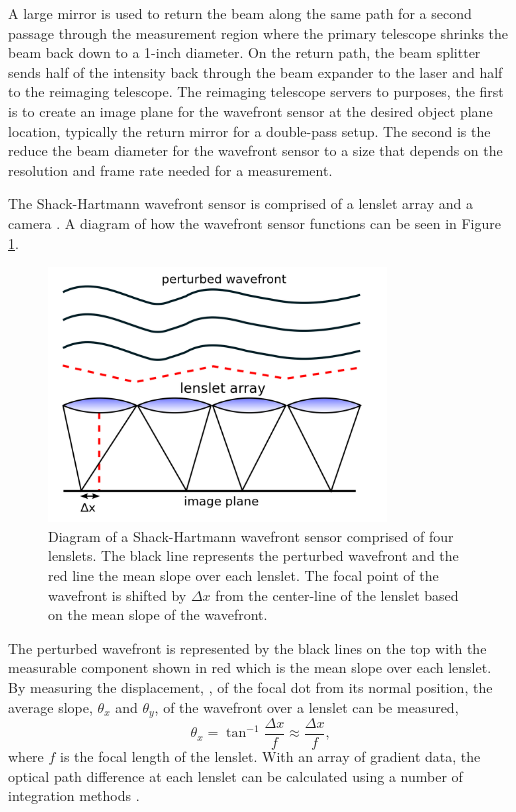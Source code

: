 A large mirror is used to return the beam along the same path for a second passage through the measurement region where the primary telescope shrinks the beam back down to a 1-inch diameter.
On the return path, the beam splitter sends half of the intensity back through the beam expander to the laser and half to the reimaging telescope.
The reimaging telescope servers to purposes, the first is to create an image plane for the wavefront sensor at the desired object plane location, typically the return mirror for a double-pass setup.
The second is the reduce the beam diameter for the wavefront sensor to a size that depends on the resolution and frame rate needed for a measurement.

The Shack-Hartmann wavefront sensor is comprised of a lenslet array and a camera \cite{Geary-1995-TQXWWFW2}.
A diagram of how the wavefront sensor functions can be seen in Figure \ref{fig:02_lenslet_array}.
\begin{figure}
  \centering
  \includegraphics[width=0.8\textwidth]{../other-sources/Shack_Hartmann_WFS_lensletarray.png}
  \caption{Diagram of a Shack-Hartmann wavefront sensor comprised of four lenslets. The black line represents the perturbed wavefront and the red line the mean slope over each lenslet. The focal point of the wavefront is shifted by $\Delta x$ from the center-line of the lenslet based on the mean slope of the wavefront. \cite{Shack-Hartman-Diagram-Wikipedia}}
  \label{fig:02_lenslet_array}
\end{figure}
The perturbed wavefront is represented by the black lines on the top with the measurable component shown in red which is the mean slope over each lenslet.
By measuring the displacement, \cite{Nightingale-2013-gqr4p7GY}, of the focal dot from its normal position, the average slope, $\theta_x$ and $\theta_y$, of the wavefront over a lenslet can be measured,
\begin{equation}
  \theta_x = \tan^{-1}{\frac{\Delta x}{f}} \approx\frac{\Delta x}{f} \textrm{,}
\end{equation}
where $f$ is the focal length of the lenslet.
With an array of gradient data, the optical path difference at each lenslet can be calculated using a number of integration methods \cite{Huang-2015-W29DqPyp}.

